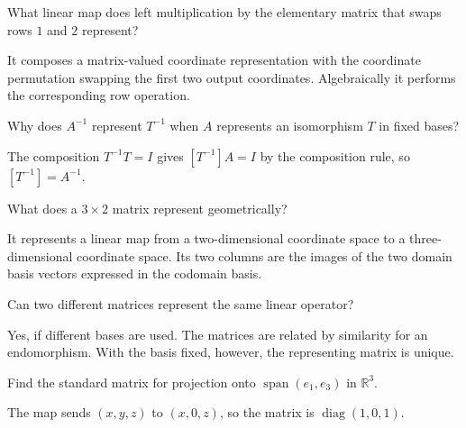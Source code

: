 \begin{problem}\label{prob:i07-problem-06}
What linear map does left multiplication by the elementary matrix that swaps rows $1$ and $2$ represent?
\end{problem}
\begin{solution}
It composes a matrix-valued coordinate representation with the coordinate permutation swapping the first two output coordinates. Algebraically it performs the corresponding row operation.
\end{solution}

\begin{problem}\label{prob:i07-problem-07}
Why does $A^{-1}$ represent $T^{-1}$ when $A$ represents an isomorphism $T$ in fixed bases?
\end{problem}
\begin{solution}
The composition $T^{-1}T=I$ gives $[T^{-1}]A=I$ by the composition rule, so $[T^{-1}]=A^{-1}$.
\end{solution}

\begin{problem}\label{prob:i07-problem-08}
What does a $3\times2$ matrix represent geometrically?
\end{problem}
\begin{solution}
It represents a linear map from a two-dimensional coordinate space to a three-dimensional coordinate space. Its two columns are the images of the two domain basis vectors expressed in the codomain basis.
\end{solution}

\begin{problem}\label{prob:i07-problem-09}
Can two different matrices represent the same linear operator?
\end{problem}
\begin{solution}
Yes, if different bases are used. The matrices are related by similarity for an endomorphism. With the basis fixed, however, the representing matrix is unique.
\end{solution}

\begin{problem}\label{prob:i07-problem-10}
Find the standard matrix for projection onto $\operatorname{span}(e_1,e_3)$ in $\mathbb R^3$.
\end{problem}
\begin{solution}
The map sends $(x,y,z)$ to $(x,0,z)$, so the matrix is $\operatorname{diag}(1,0,1)$.
\end{solution}

